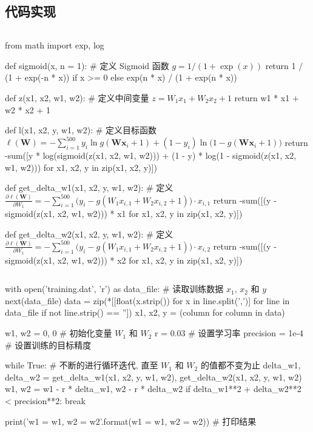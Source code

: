 \subsection{代码实现}
\begin{frame}[fragile]{\insertsection}{\insertsubsection}
\begin{columns}
\column{\dimexpr\paperwidth-10pt}\vspace{-20pt}
\begin{pythoncode}[fontsize = \fontsize{8}{8}\selectfont]
from math import exp, log

def sigmoid(x, n = 1): # 定义 Sigmoid 函数 $g = 1/(1 + \exp(x))$
  return 1 / (1 + exp(-n * x)) if x >= 0 else exp(n * x) / (1 + exp(n * x))

def z(x1, x2, w1, w2): # 定义中间变量 $z = W_1x_1 + W_2x_2 + 1$
  return w1 * x1 + w2 * x2 + 1

def l(x1, x2, y, w1, w2): # 定义目标函数 $\ell(\bm{W}) =  -\sum_{i = 1}^{500} y_i\ln g(\bm{W}\bm{x}_i + 1) + (1 - y_i)\ln\big(1 - g(\bm{W}\bm{x}_i + 1)\big)$
  return -sum([y * log(sigmoid(z(x1, x2, w1, w2))) + (1 - y) * log(1 - sigmoid(z(x1, x2, w1, w2))) for x1, x2, y in zip(x1, x2, y)])

def get_delta_w1(x1, x2, y, w1, w2): # 定义 $\frac{\partial \ell(\bm{W})}{\partial W_1} = -\sum_{i = 1}^{500} \big(y_i - g(W_1x_{i,1} + W_2x_{i,2} + 1)\big)\cdot x_{i,1}$
  return -sum([(y - sigmoid(z(x1, x2, w1, w2))) * x1 for x1, x2, y in zip(x1, x2, y)])

def get_delta_w2(x1, x2, y, w1, w2): # 定义 $\frac{\partial \ell(\bm{W})}{\partial W_1} = -\sum_{i = 1}^{500} \big(y_i - g(W_1x_{i,1} + W_2x_{i,2} + 1)\big)\cdot x_{i,2}$
  return -sum([(y - sigmoid(z(x1, x2, w1, w2))) * x2 for x1, x2, y in zip(x1, x2, y)])
\end{pythoncode}
\end{columns}
\end{frame}

\begin{frame}[fragile]{\insertsection}{\insertsubsection}
\begin{columns}
\column{\dimexpr\paperwidth-10pt}\vspace{-20pt}
\begin{pythoncode}[fontsize = \fontsize{8}{8}\selectfont]
with open('training.dat', 'r') as data_file: # 读取训练数据 $x_1$, $x_2$ 和 $y$
  next(data_file)
  data = zip(*[[float(x.strip()) for x in line.split(',')] for line in data_file if not line.strip() == ''])
x1, x2, y = (column for column in data)

w1, w2 = 0, 0 # 初始化变量 $W_1$ 和 $W_2$
r = 0.03 # 设置学习率
precision = 1e-4 # 设置训练的目标精度

while True: # 不断的进行循环迭代, 直至 $W_1$ 和 $W_2$ 的值都不变为止
  delta_w1, delta_w2 = get_delta_w1(x1, x2, y, w1, w2), get_delta_w2(x1, x2, y, w1, w2)
  w1, w2 = w1 - r * delta_w1, w2 - r * delta_w2
  if delta_w1**2 + delta_w2**2 < precision**2:
    break

print('w1 = {w1}, w2 = {w2}'.format(w1 = w1, w2 = w2)) # 打印结果
\end{pythoncode}
\end{columns}
\end{frame}


